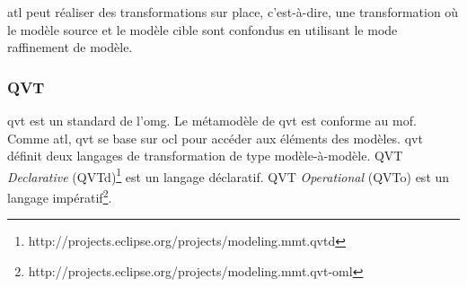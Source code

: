 \gls{atl} peut réaliser des transformations sur place, c'est-à-dire, une 
transformation où le modèle source et le modèle cible sont confondus en 
utilisant le mode raffinement de modèle. 


\subsubsection{QVT}
\gls{qvt} \cite{kurtev2008state} \cite{omg2011meta} est un standard de l'\gls{omg}. Le métamodèle de \gls{qvt} est conforme au \gls{mof}. Comme \gls{atl}, \gls{qvt} se base sur \gls{ocl} pour accéder aux éléments des modèles.
\gls{qvt} définit deux langages de transformation de type modèle-à-modèle. 
QVT \textit{Declarative} (QVTd)\footnote{http://projects.eclipse.org/projects/modeling.mmt.qvtd} est un langage déclaratif. QVT \textit{Operational} (QVTo) est un langage impératif\footnote{http://projects.eclipse.org/projects/modeling.mmt.qvt-oml}.


%
%

